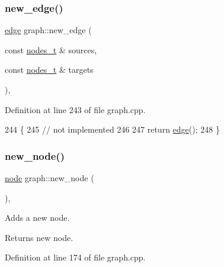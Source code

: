 \subsubsection{\texorpdfstring{new\+\_\+edge()}{new\_edge()}\hspace{0.1cm}{\footnotesize\ttfamily [2/2]}}
{\footnotesize\ttfamily \mbox{\hyperlink{classedge}{edge}} graph\+::new\+\_\+edge (\begin{DoxyParamCaption}\item[{const \mbox{\hyperlink{edge_8h_a22ac17689106ba21a84e7bc54d1199d6}{nodes\+\_\+t}} \&}]{sources,  }\item[{const \mbox{\hyperlink{edge_8h_a22ac17689106ba21a84e7bc54d1199d6}{nodes\+\_\+t}} \&}]{targets }\end{DoxyParamCaption})\hspace{0.3cm}{\ttfamily [virtual]}, {\ttfamily [inherited]}}



Definition at line 243 of file graph.\+cpp.


\begin{DoxyCode}
244 \{
245     \textcolor{comment}{// not implemented}
246 
247     \textcolor{keywordflow}{return} \mbox{\hyperlink{classedge}{edge}}();
248 \}
\end{DoxyCode}
\mbox{\label{classgraph_ab9505335c20558319b6cce25aed23524}} 
\subsubsection{\texorpdfstring{new\+\_\+node()}{new\_node()}}
{\footnotesize\ttfamily \mbox{\hyperlink{classnode}{node}} graph\+::new\+\_\+node (\begin{DoxyParamCaption}{ }\end{DoxyParamCaption})\hspace{0.3cm}{\ttfamily [virtual]}, {\ttfamily [inherited]}}

Adds a new node.

\begin{DoxyReturn}{Returns}
new node. 
\end{DoxyReturn}


Definition at line 174 of file graph.\+cpp.


